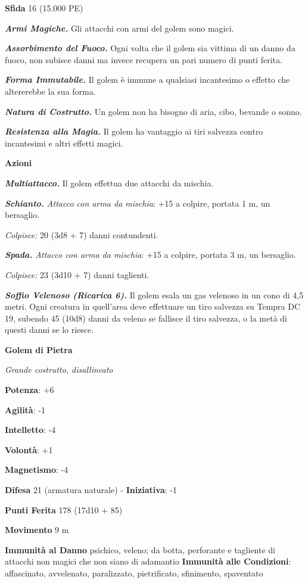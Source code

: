 \begin{multicols}{2}
\textbf{Sfida} 16 (15.000 PE)\smallskip

\emph{\textbf{Armi Magiche.}} Gli attacchi con armi del golem sono
magici.

\emph{\textbf{Assorbimento del Fuoco.}} Ogni volta che il golem sia
vittima di un danno da fuoco, non subisce danni ma invece recupera un
pari numero di punti ferita.

\emph{\textbf{Forma Immutabile.}} Il golem è immune a qualsiasi
incantesimo o effetto che altererebbe la sua forma.

\emph{\textbf{Natura di Costrutto.}} Un golem non ha bisogno di aria,
cibo, bevande o sonno.

\emph{\textbf{Resistenza alla Magia.}} Il golem ha vantaggio ai tiri
salvezza contro incantesimi e altri effetti magici.

\smallskip\textbf{Azioni}

\emph{\textbf{Multiattacco.}} Il golem effettua due attacchi da mischia.

\emph{\textbf{Schianto.} Attacco con arma da mischia}: +15 a colpire,
portata 1 m, un bersaglio.

\emph{Colpisce:} 20 (3d8 + 7) danni contundenti.

\emph{\textbf{Spada.} Attacco con arma da mischia}: +15 a colpire,
portata 3 m, un bersaglio.

\emph{Colpisce:} 23 (3d10 + 7) danni taglienti.

\emph{\textbf{Soffio Velenoso (Ricarica 6).}} Il golem esala un gas
velenoso in un cono di 4,5 metri. Ogni creatura in quell'area deve
effettuare un tiro salvezza su Tempra DC 19, subendo 45 (10d8)
danni da veleno se fallisce il tiro salvezza, o la metà di questi danni
se lo riesce.

\textbf{Golem di Pietra}

\emph{Grande costrutto, disallineato}

\textbf{Potenza}: +6

\textbf{Agilità}: -1

\textbf{Intelletto}: -4

\textbf{Volontà}: +1

\textbf{Magnetismo}: -4

\textbf{Difesa} 21 (armatura naturale) - \textbf{Iniziativa}: -1

\textbf{Punti Ferita} 178 (17d10 + 85)

\textbf{Movimento} 9 m

\textbf{Immunità al Danno} psichico, veleno; da botta, perforante e
tagliente di attacchi non magici che non siano di adamantio
\textbf{Immunità alle Condizioni}: affascinato, avvelenato, paralizzato,
pietrificato, sfinimento, spaventato


\end{multicols}
